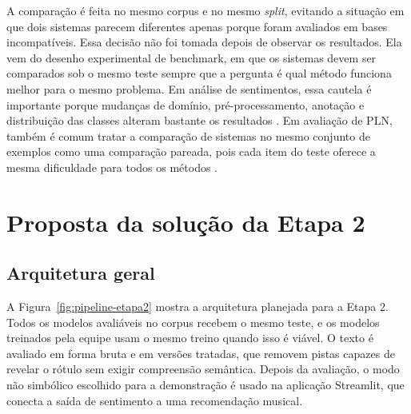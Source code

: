 \documentclass[11pt,a4paper]{article}
\begin{document}
A comparação é feita no mesmo corpus e no mesmo \emph{split}, evitando a situação em que dois sistemas parecem diferentes apenas porque foram avaliados em bases incompatíveis. Essa decisão não foi tomada depois de observar os resultados. Ela vem do desenho experimental de benchmark, em que os sistemas devem ser comparados sob o mesmo teste sempre que a pergunta é qual método funciona melhor para o mesmo problema. Em análise de sentimentos, essa cautela é importante porque mudanças de domínio, pré-processamento, anotação e distribuição das classes alteram bastante os resultados \citep{ribeiro2016sentibench}. Em avaliação de PLN, também é comum tratar a comparação de sistemas no mesmo conjunto de exemplos como uma comparação pareada, pois cada item do teste oferece a mesma dificuldade para todos os métodos \citep{dror2017replicability}.

\section{Proposta da solução da Etapa 2}

\subsection{Arquitetura geral}

A Figura~\ref{fig:pipeline-etapa2} mostra a arquitetura planejada para a Etapa 2. Todos os modelos avaliáveis no corpus recebem o mesmo teste, e os modelos treinados pela equipe usam o mesmo treino quando isso é viável. O texto é avaliado em forma bruta e em versões tratadas, que removem pistas capazes de revelar o rótulo sem exigir compreensão semântica. Depois da avaliação, o modo não simbólico escolhido para a demonstração é usado na aplicação Streamlit, que conecta a saída de sentimento a uma recomendação musical.
\end{document}

